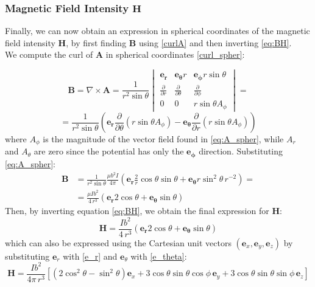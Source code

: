 \subsubsection{Magnetic Field Intensity $\mathbf{H}$}
Finally, we can now obtain an expression in spherical coordinates of the magnetic field intensity $\mathbf{H}$, by first finding $\mathbf{B}$ using \ref{curlA} and then inverting \ref{eq:BH}.
\\
We compute the curl of $\mathbf{A}$ in spherical coordinates \ref{curl_spher}:

\[
\mathbf{B} = \nabla \times \mathbf{A} = \frac{1}{r^2 \sin \theta} \begin{vmatrix}
    \mathbf{e_r} & \mathbf{e_\theta} r & \mathbf{e_\phi} r \sin \theta \\
    \frac{\partial}{\partial r} & \frac{\partial}{\partial \theta} & \frac{\partial}{\partial \phi} \\
    0 & 0 & r \sin \theta A_\phi
\end{vmatrix} =
\]
\[
= \frac{1}{r^2 \sin \theta} \left( \mathbf{e_r} \frac{\partial}{\partial \theta} (r \sin \theta A_\phi) - \mathbf{e_\theta} \frac{\partial}{\partial r} (r \sin \theta A_\phi) \right)
\]
where $A_\phi$ is the magnitude of the vector field found in \ref{eq:A_spher}, while $A_r$ and $A_\theta$ are zero since the potential has only the $\mathbf{e_\phi}$ direction. Substituting \ref{eq:A_spher}:
\[
\begin{aligned}
    \mathbf{B}&= \frac{1}{r^2 \sin \theta} \frac{\mu b^2 I}{4 \pi} \left(\mathbf{e_r} \frac{2}{r} \cos \theta \sin \theta  + \mathbf{e_\theta} r \sin^2\theta \, r^{-2}\right) =
    \\
     &= \frac{\mu I b^2 }{4 \, r^3} \left( \mathbf{e_r} 2 \cos \theta + \mathbf{e_\theta} \sin \theta \right)
\end{aligned}
\]
Then, by inverting equation \ref{eq:BH}, we obtain the final expression for $\mathbf{H}$:
\begin{equation}
    \mathbf{H} = \frac{ I b^2}{4 \, r^3} \left( \mathbf{e_r} 2 \cos \theta + \mathbf{e_\theta} \sin \theta \right)
    \label{eq:H_spheric}
\end{equation}
which can also be expressed using the Cartesian unit vectors \((\mathbf{e}_x, \mathbf{e}_y, \mathbf{e}_z)\) by substituting \(\mathbf{e}_r\) with \ref{e_r} and \(\mathbf{e}_\theta\) with \ref{e_theta}:
\[
\mathbf{H} = \frac{I b^2}{4 \pi \, r^3} \left[ (2\cos^2\theta - \sin^2\theta) \mathbf{e}_x + 3\cos\theta \sin\theta \cos\phi \, \mathbf{e}_y + 3\cos\theta \sin\theta \sin\phi \, \mathbf{e}_z \right]
\]

